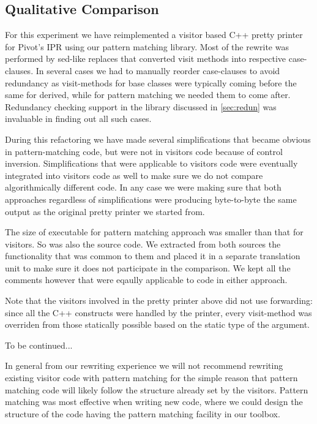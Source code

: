 \documentclass[preprint]{sigplanconf}
\begin{document}
\subsection{Qualitative Comparison}
\label{sec:qualcmp}

For this experiment we have reimplemented a visitor based C++ pretty printer for 
Pivot's IPR using our pattern matching library. Most of the rewrite was 
performed by sed-like replaces that converted visit methods into respective 
case-clauses. In several cases we had to manually reorder case-clauses to avoid 
redundancy as visit-methods for base classes were typically coming before the 
same for derived, while for pattern matching we needed them to come after. 
Redundancy checking support in the library discussed in \textsection\ref{sec:redun}
was invaluable in finding out all such cases.

During this refactoring we have made several simplifications that became obvious 
in pattern-matching code, but were not in visitors code because of control 
inversion. Simplifications that were applicable to visitors code were eventually 
integrated into visitors code as well to make sure we do not compare 
algorithmically different code. In any case we were making sure that both 
approaches regardless of simplifications were producing byte-to-byte the same 
output as the original pretty printer we started from.

The size of executable for pattern matching approach was smaller than that for 
visitors. So was also the source code. We extracted from both sources the 
functionality that was common to them and placed it in a separate translation 
unit to make sure it does not participate in the comparison. We kept all the 
comments however that were eqaully applicable to code in either approach.

Note that the visitors involved in the pretty printer above did not use 
forwarding: since all the C++ constructs were handled by the printer, every 
visit-method was overriden from those statically possible based on the static 
type of the argument.


To be continued...

In general from our rewriting experience we will not recommend rewriting 
existing visitor code with pattern matching for the simple reason that pattern 
matching code will likely follow the structure already set by the visitors. 
Pattern matching was most effective when writing new code, where we could design 
the structure of the code having the pattern matching facility in our toolbox.
\end{document}
